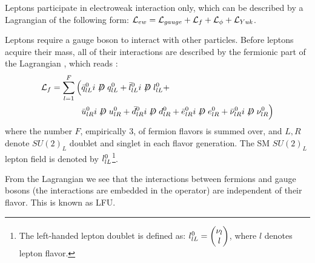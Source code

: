 Leptons participate in electroweak interaction only,
which can be described by a Lagrangian of the following form:
$\mathcal{L}_{ew} = \mathcal{L}_{gauge} + \mathcal{L}_{f} + \mathcal{L}_{\phi} + \mathcal{L}_{Yuk}$.

Leptons require a gauge boson to interact with other particles.
Before leptons acquire their mass, all of their interactions are described by the fermionic part of the Lagrangian , 
which reads \cite{Langacker:2010zza}:
\begin{align}
    \Lden{f} = \sum_{l = 1}^F \Big(
        & \bar{\spin{q}}^0_{lL} i \fsl{D} \spin{q}^0_{lL} +
          \bar{\spin{l}}^0_{lL} i \fsl{D} \spin{l}^0_{lL} + \nonumber \\
        & \bar{u}^0_{lR} i \fsl{D} u^0_{lR} +
          \bar{d}^0_{lR} i \fsl{D} d^0_{lR} +
          \bar{e}^0_{lR} i \fsl{D} e^0_{lR} +
          \bar{\nu}^0_{lR} i \fsl{D} \nu^0_{lR}
    \Big)
\end{align}
where the number $F$, empirically 3, of fermion flavors is summed over, and
$L,R$ denote $SU(2)_L$ doublet and singlet in each flavor generation.
The SM $SU(2)_L$ lepton field is denoted by $l^0_{lL}$\footnote{
    The left-handed lepton doublet is defined as:
    $l^0_{lL} = \begin{pmatrix} \nu_l \\ l \end{pmatrix}$,
    where $l$ denotes lepton flavor.
}.

From the Lagrangian we see that the interactions between fermions and gauge
bosons (the interactions are embedded in the  operator) are independent
of their flavor.
This is known as LFU.